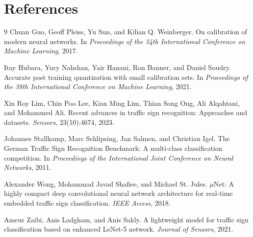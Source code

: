 \documentclass{article} %
\begin{document}
\section{References}
\vspace{-0.6em}
\small
\begin{thebibliography}{9}
Chuan Guo, Geoff Pleiss, Yu Sun, and Kilian Q. Weinberger.
\newblock On calibration of modern neural networks.
\newblock In \emph{Proceedings of the 34th International Conference on Machine Learning}, 2017.

Itay Hubara, Yury Nahshan, Yair Hanani, Ron Banner, and Daniel Soudry.
\newblock Accurate post training quantization with small calibration sets.
\newblock In \emph{Proceedings of the 38th International Conference on Machine Learning}, 2021.

Xin Roy Lim, Chin Poo Lee, Kian Ming Lim, Thian Song Ong, Ali Alqahtani, and Mohammed Ali.
\newblock Recent advances in traffic sign recognition: Approaches and datasets.
\newblock \emph{Sensors}, 23(10):4674, 2023.

Johannes Stallkamp, Marc Schlipsing, Jan Salmen, and Christian Igel.
\newblock The German Traffic Sign Recognition Benchmark: A multi-class classification competition.
\newblock In \emph{Proceedings of the International Joint Conference on Neural Networks}, 2011.

Alexander Wong, Mohammad Javad Shafiee, and Michael St. Jules.
\newblock $\mu$Net: A highly compact deep convolutional neural network architecture for real-time embedded traffic sign classification.
\newblock \emph{IEEE Access}, 2018.

Ameur Zaibi, Anis Ladgham, and Anis Sakly.
\newblock A lightweight model for traffic sign classification based on enhanced LeNet-5 network.
\newblock \emph{Journal of Sensors}, 2021.

\end{thebibliography}
\end{document}
